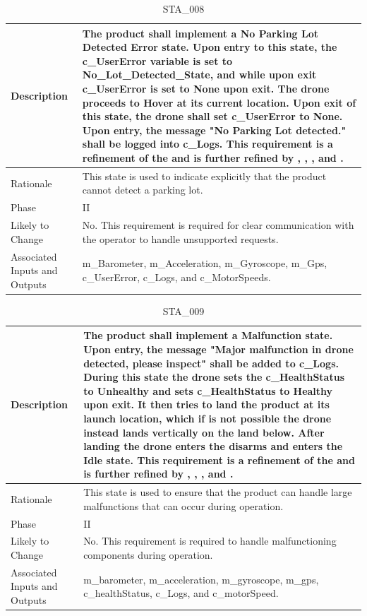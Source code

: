 \documentclass{article}
\begin{document}
\begin{table}[!h]
\begin{center}
\caption {STA\_008} 
\label{STA_008}
\begin{tabular}{ | m{3cm} | m{11cm} | }
\hline
Description & The product shall implement a No Parking Lot Detected Error state. Upon entry to this state, the c\_UserError variable is set to No_Lot_Detected_State, and while upon exit c\_UserError is set to None upon exit. The drone proceeds to Hover at its current location. Upon exit of this state, the drone shall set c\_UserError to None. Upon entry, the message "No Parking Lot detected." shall be logged into c\_Logs. This requirement is a refinement of the \nameref{No Parking Lot Detected Error State} and is further refined by \nameref{PERF_007}, \nameref{SAFE_001}, \nameref{SAFE_003}, and \nameref{USE_003}. \\
\hline
Rationale & This state is used to indicate explicitly that the product cannot detect a parking lot. \\
\hline
Phase & II \\
\hline
Likely to Change & No. This requirement is required for clear communication with the operator to handle unsupported requests. \\
\hline
Associated Inputs and Outputs & m\_Barometer, m\_Acceleration, m\_Gyroscope, m\_Gps, c\_UserError, c\_Logs, and c\_MotorSpeeds. \\
\hline
\end{tabular}
\end{center}
\end{table}

\begin{table}[!h]
\begin{center}
\caption {STA\_009} 
\label{STA_009}
\begin{tabular}{ | m{3cm} | m{11cm} | }
\hline
Description & The product shall implement a Malfunction state. Upon entry, the message "Major malfunction in drone detected, please inspect" shall be added to c\_Logs. During this state the drone sets the c\_HealthStatus to Unhealthy and sets c\_HealthStatus to Healthy upon exit. It then tries to land the product at its launch location, which if is not possible the drone instead lands vertically on the land below. After landing the drone enters the disarms and enters the Idle state. This requirement is a refinement of the \nameref{Malfunction State} and is further refined by \nameref{PERF_007}, \nameref{SAFE_001}, \nameref{SAFE_003}, and \nameref{USE_003}. \\
\hline
Rationale & This state is used to ensure that the product can handle large malfunctions that can occur during operation. \\
\hline
Phase & II \\
\hline
Likely to Change & No. This requirement is required to handle malfunctioning components during operation. \\
\hline
Associated Inputs and Outputs & m\_barometer, m\_acceleration, m\_gyroscope, m\_gps, c\_healthStatus, c\_Logs, and c\_motorSpeed. \\
\hline
\end{tabular}
\end{center}
\end{table}
\end{document}
